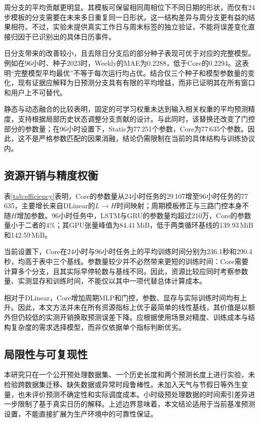 \documentclass[UTF8,a4paper,zihao=5,fontset=windows]{ctexart}
\begin{document}
周分支的平均贡献更明显。其模板可保留相同周相位下不同日期的形状，而仅有24步模板的分支需要在未来多日重复同一日形状。这一结构差异与周分支更有益的结果相符。不过，实验未提供真实工作日与周末标签的独立验证，不能将误差变化直接归因于已识别出的具体日历事件。

日分支带来的改善较小，且去除日分支后的部分种子表现可优于对应的完整模型。例如在96小时、种子2023时，Weekly的MAE为0.2288，低于Core的0.2294。这表明“完整模型平均最优”不等于每次运行均占优。结合仅三个种子和模型参数量的变化，现有证据应解释为日预测分支具有有限的平均增益，而非已证明其在所有窗口和用户上不可替代。

静态与动态融合的比较表明，固定的可学习权重未达到输入相关权重的平均预测精度，支持根据局部历史状态调整分支贡献的设计。与此同时，该替换还改变了门控部分的参数量；在96小时设置下，Static为77\,251个参数，Core为77\,635个参数。因此，这不是严格参数匹配的因果消融，结论仍需限制在当前的具体结构与训练协议内。

\subsection{资源开销与精度权衡}

表\ref{tab:efficiency}表明，Core的参数量从24小时任务的29\,107增至96小时任务的77\,635，主要增长来自DLinear的$L\rightarrow H$时间映射；周期模板修正与三路门控本身不随$H$增加参数。96小时任务中，LSTM与GRU的参数量均超过210万，Core的参数量小于二者的4\%；其GPU张量峰值为84.41\,MiB，低于两类循环基线的139.93\,MiB和142.59\,MiB。

当前设置下，Core在24小时与96小时任务上的平均训练时间分别为236.1秒和290.4秒，均高于表中三个基线。参数量较少并不必然带来更短的训练时间：Core需要计算多个分支，且其实际早停轮数与基线不同。因此，资源比较应同时考察参数量、实测显存和训练时间，不能仅以其中一项代替总体计算成本。

相对于DLinear，Core增加周期MLP和门控，参数、显存与实际训练时间均有上升。因此，本文方法并未在所有资源指标上优于最简单的线性基线，其价值是以额外但仍较低的实测开销换取预测误差下降。应根据使用场景对精度、训练成本与结构复杂度的需求选择模型，而非仅依据单个指标判断优劣。

\subsection{局限性与可复现性}
本研究只在一个公开预处理数据集、一个历史长度和两个预测长度上进行实验，未检验跨数据集迁移、缺失数据或异常时段鲁棒性。未加入天气与节假日等外生变量，也未评价预测不确定性和实际调度成本。小时级预处理数据的时间索引差异进一步限制了基于真实日历的解释。上述边界意味着，本文结论适用于当前基准预测设置，不能直接扩展为生产环境中的可靠性保证。
\end{document}
